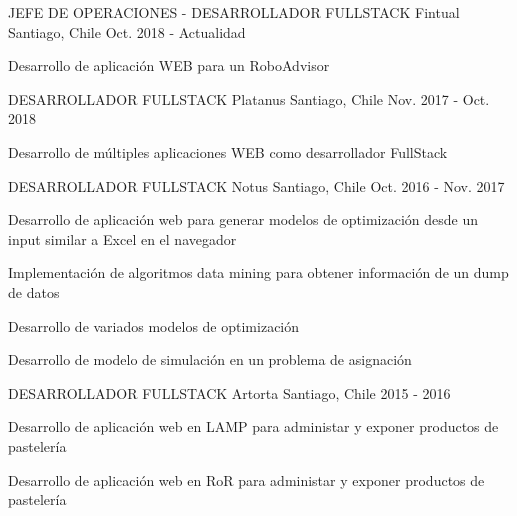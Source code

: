 

\begin{cventries}

  \cventry
    {JEFE DE OPERACIONES - DESARROLLADOR FULLSTACK} %
    {Fintual} %
    {Santiago, Chile} %
    {Oct. 2018 - Actualidad} %
    {
      \begin{cvitems} %
        \item {Desarrollo de aplicación WEB para un RoboAdvisor}
      \end{cvitems}
    }%

  \cventry
    {DESARROLLADOR FULLSTACK} %
    {Platanus} %
    {Santiago, Chile} %
    {Nov. 2017 - Oct. 2018} %
    {
      \begin{cvitems} %
        \item {Desarrollo de múltiples aplicaciones WEB como desarrollador FullStack}
      \end{cvitems}
    }%

  \cventry
    {DESARROLLADOR FULLSTACK} %
    {Notus} %
    {Santiago, Chile} %
    {Oct. 2016 - Nov. 2017} %
    {
      \begin{cvitems} %
        \item {Desarrollo de aplicación web para generar modelos de optimización desde un input similar a Excel en el navegador}
        \item {Implementación de algoritmos data mining para obtener información de un dump de datos}
        \item {Desarrollo de variados modelos de optimización}
        \item {Desarrollo de modelo de simulación en un problema de asignación}
      \end{cvitems}
    }

  \cventry
    {DESARROLLADOR FULLSTACK} %
    {Artorta} %
    {Santiago, Chile} %
    {2015 - 2016} %
    {
      \begin{cvitems} %
        \item {Desarrollo de aplicación web en LAMP para administar y exponer productos de pastelería}
        \item {Desarrollo de aplicación web en RoR para administar y exponer productos de pastelería}
      \end{cvitems}
    }

\end{cventries}
